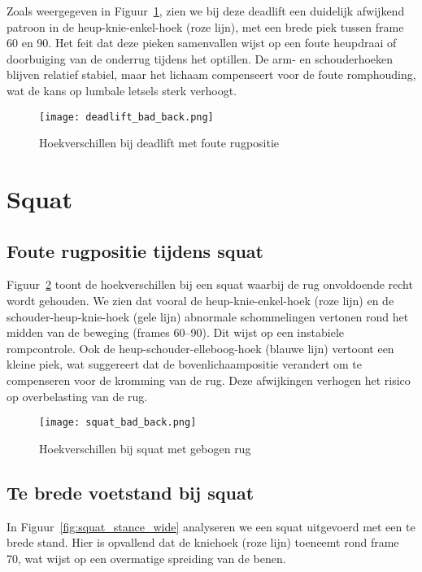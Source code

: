 Zoals weergegeven in Figuur~\ref{fig:deadlift_bad_back}, zien we bij deze deadlift een duidelijk afwijkend patroon in de heup-knie-enkel-hoek (roze lijn), met een brede piek tussen frame 60 en 90. 
Het feit dat deze pieken samenvallen wijst op een foute heupdraai of doorbuiging van de onderrug tijdens het optillen. 
De arm- en schouderhoeken blijven relatief stabiel, maar het lichaam compenseert voor de foute romphouding, wat de kans op lumbale letsels sterk verhoogt.

\begin{figure}[h]
\centering
\texttt{[image: deadlift\_bad\_back.png]}
\caption{Hoekverschillen bij deadlift met foute rugpositie}
\label{fig:deadlift_bad_back}
\end{figure}

\section{Squat}
\subsection{Foute rugpositie tijdens squat}

Figuur~\ref{fig:squat_bad_back} toont de hoekverschillen bij een squat waarbij de rug onvoldoende recht wordt gehouden. 
We zien dat vooral de heup-knie-enkel-hoek (roze lijn) en de schouder-heup-knie-hoek (gele lijn) abnormale schommelingen vertonen rond het midden van de beweging (frames 60–90). 
Dit wijst op een instabiele rompcontrole.
Ook de heup-schouder-elleboog-hoek (blauwe lijn) vertoont een kleine piek, wat suggereert dat de bovenlichaampositie verandert om te compenseren voor de kromming van de rug. 
Deze afwijkingen verhogen het risico op overbelasting van de rug.

\begin{figure}[h]
\centering
\texttt{[image: squat\_bad\_back.png]}
\caption{Hoekverschillen bij squat met gebogen rug}
\label{fig:squat_bad_back}
\end{figure}


\subsection{Te brede voetstand bij squat}

In Figuur~\ref{fig:squat_stance_wide} analyseren we een squat uitgevoerd met een te brede stand. 
Hier is opvallend dat de kniehoek (roze lijn) toeneemt rond frame 70, wat wijst op een overmatige spreiding van de benen. 

